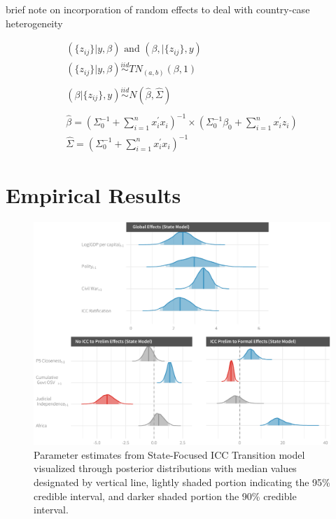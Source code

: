 brief note on incorporation of random effects to deal with country-case heterogeneity

\begin{eqnarray}
	(\{z_{ij}\} | y,\beta)\text{ and }(\beta,|\{z_{ij}\},y) \nonumber \\
	(\{z_{ij}\} | y,\beta)\stackrel{iid}{\sim}TN_{(a,b)}(\beta,1) \nonumber \\
	\nonumber \\
	(\beta | \{z_{ij}\},y)\stackrel{iid}{\sim}N(\hat{\beta},\hat{\Sigma}) \nonumber \\
	\nonumber \\
	\hat{\beta} = (\Sigma_{0}^{-1}+\sum_{i=1}^{n} x_{i}^{'}x_{i})^{-1} \times (\Sigma_{0}^{-1}\beta_{0}+\sum_{i=1}^{n} x_{i}^{'}z_{i}) \nonumber \\
	\hat{\Sigma} = (\Sigma_{0}^{-1} + \sum_{i=1}^{n} x_{i}^{'}x_{i})^{-1} \nonumber
\end{eqnarray}



\section*{Empirical Results}

\begin{figure}
    \centering
    \includegraphics[width=1\textwidth]{stateCoefSumm.pdf}
    \caption{Parameter estimates from State-Focused ICC Transition model visualized through posterior distributions with median values designated by vertical line, lightly shaded portion indicating the 95\% credible interval, and darker shaded portion the 90\% credible interval.}
    \label{fig:stateModel}
\end{figure}


